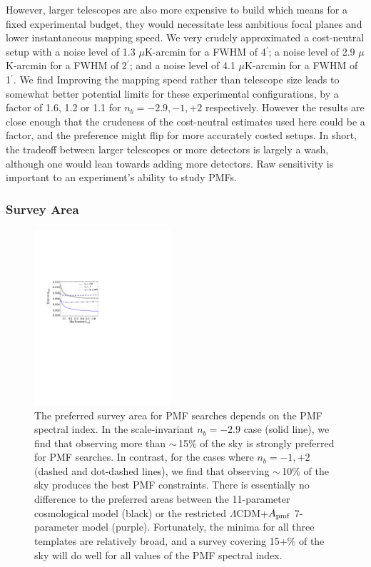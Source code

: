 \documentclass[apj]{emulateapj}
\newcommand{\apmf}{\ensuremath{A_{\rm pmf}}}
\newcommand{\lcdm}{\ensuremath{\Lambda}CDM}
\newcommand{\ukarcmin}{\ensuremath{\mu}K-arcmin}
\begin{document}
However, larger telescopes are also more expensive to build which means for a fixed experimental budget, they would necessitate less ambitious focal planes and lower instantaneous mapping speed. 
We very crudely approximated a cost-neutral setup with a noise level of 1.3 \ukarcmin{} for a FWHM of 4$^\prime$; a noise level of 2.9 \ukarcmin{} for a FWHM of 2$^\prime$; and a noise level of 4.1 \ukarcmin{} for a FWHM of 1$^\prime$. 
We find 
Improving the mapping speed rather than telescope size leads to somewhat better potential limits for these experimental configurations, by a factor of 1.6, 1.2 or 1.1 for $n_b = -2.9, -1, +2$ respectively. 
However the results are close enough that the crudeness of the cost-neutral estimates used here could be a factor, and the preference might flip for more accurately costed setups. 
In short,  the tradeoff between larger telescopes or more detectors is largely a wash, although one would lean towards adding more detectors. 
Raw sensitivity is important to an experiment's ability to study PMFs.

\subsubsection{Survey Area}

\begin{figure}[htb]\centering
\includegraphics[width=0.45\textwidth,clip,trim={1.5cm 12.5cm 11cm 7.5cm}]{pmf_area.pdf}
  \caption[Area dependence]{
  The preferred survey area for PMF searches depends on the PMF spectral index. 
    In the scale-invariant $n_b = -2.9$ case (solid line), we find that observing more than $\sim$\,15\% of the sky is strongly preferred for PMF searches. 
 In contrast, for the cases where $n_b = -1, +2$ (dashed and dot-dashed lines), we find that observing  $\sim$\,10\% of the sky produces the best PMF constraints. 
   There is essentially no difference to the preferred areas between the 11-parameter cosmological model (black) or the restricted \lcdm{}+\apmf{} 7-parameter model (purple). 
     Fortunately, the minima for all three templates are relatively broad, and a survey covering 15+\% of the sky will do well for all values of the PMF spectral index. 
    \label{fig:area}
  }
\end{figure}
\end{document}

